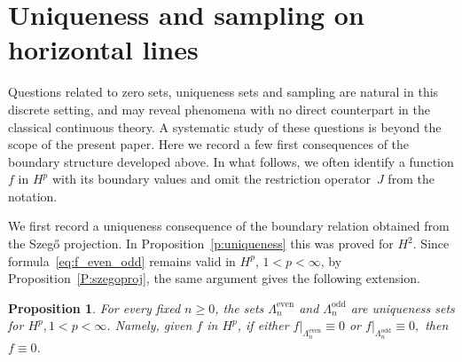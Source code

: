 \documentclass[12pt,a4paper,reqno]{amsart}
\newtheorem{prop}[thm]{Proposition}
\theoremstyle{definition}
\theoremstyle{definition}\newtheorem{defn}[thm]{Definition}
\begin{document}
    \section{Uniqueness and sampling on horizontal lines}\label{s:sampling}
    
    Questions related to zero sets, uniqueness sets and sampling are natural in this discrete setting, and may reveal phenomena with no direct
    counterpart in the classical continuous theory. A systematic study of these
    questions is beyond the scope of the present paper. Here we record a few first
    consequences of the boundary structure developed above. In what follows, we
    often identify a function $f$ in $H^p$ with its boundary values and omit the
    restriction operator~$J$ from the notation.
    
    We first record a uniqueness consequence of the boundary relation obtained from
    the Szeg\H{o} projection. In Proposition~\ref{p:uniqueness} this was proved for
    $H^2$. Since formula~\eqref{eq:f_even_odd} remains valid in $H^p$, $1<p<\infty$,
    by Proposition~\ref{P:szegoproj}, the same argument gives the following
    extension.
    
    \begin{prop}
    For every fixed $n\geqslant 0$, the sets $\Lambda_{n}^{\operatorname{even}}$ and $\Lambda_{n}^{\operatorname{odd}}$ are uniqueness sets for $H^p,1<p<\infty$. Namely, given $f$ in $H^p$, if either  
    $
    f|_{\Lambda_n^{\operatorname{even}}}\equiv 0$ or $
    f|_{\Lambda_n^{\operatorname{odd}}}\equiv 0,
    $
    then $f\equiv 0$.
    \end{prop}


    
\end{document}
